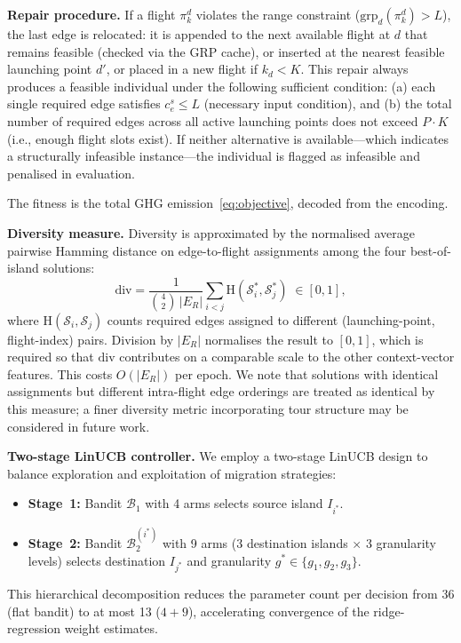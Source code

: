 \documentclass[a4paper,fleqn]{cas-dc}
\begin{document}
\textbf{Repair procedure.}
If a flight $\pi^d_k$ violates the range constraint ($\mathrm{grp}_d(\pi^d_k) > L$), the last edge is relocated: it is appended to the next available flight at $d$ that remains feasible (checked via the GRP cache), or inserted at the nearest feasible launching point $d'$, or placed in a new flight if $k_d < K$. This repair always produces a feasible individual under the following sufficient condition: (a) each single required edge satisfies $c^s_e \leq L$ (necessary input condition), and (b) the total number of required edges across all active launching points does not exceed $P \cdot K$ (i.e., enough flight slots exist). If neither alternative is available—which indicates a structurally infeasible instance—the individual is flagged as infeasible and penalised in evaluation.

The fitness is the total GHG emission~\eqref{eq:objective}, decoded from the encoding.

\textbf{Diversity measure.}
Diversity is approximated by the normalised average pairwise Hamming distance on edge-to-flight assignments among the four best-of-island solutions:
\begin{equation}\label{eq:diversity}
\mathrm{div} = \frac{1}{\binom{4}{2}\,|E_R|} \sum_{i < j} \mathrm{H}(\mathcal{S}^*_i, \mathcal{S}^*_j) \;\in [0,1],
\end{equation}
where $\mathrm{H}(\mathcal{S}_i, \mathcal{S}_j)$ counts required edges assigned to different (launching-point, flight-index) pairs. Division by $|E_R|$ normalises the result to $[0,1]$, which is required so that $\mathrm{div}$ contributes on a comparable scale to the other context-vector features. This costs $O(|E_R|)$ per epoch. We note that solutions with identical assignments but different intra-flight edge orderings are treated as identical by this measure; a finer diversity metric incorporating tour structure may be considered in future work.

\textbf{Two-stage LinUCB controller.}
We employ a two-stage LinUCB design to balance exploration and exploitation of migration strategies:
\begin{itemize}
 \item \textbf{Stage~1:} Bandit $\mathcal{B}_1$ with 4 arms selects source island $I_{i^*}$.
 \item \textbf{Stage~2:} Bandit $\mathcal{B}_2^{(i^*)}$ with 9 arms (3 destination islands $\times$ 3 granularity levels) selects destination $I_{j^*}$ and granularity $g^* \in \{g_1, g_2, g_3\}$.
\end{itemize}
This hierarchical decomposition reduces the parameter count per decision from 36 (flat bandit) to at most 13 ($4 + 9$), accelerating convergence of the ridge-regression weight estimates.
\end{document}

